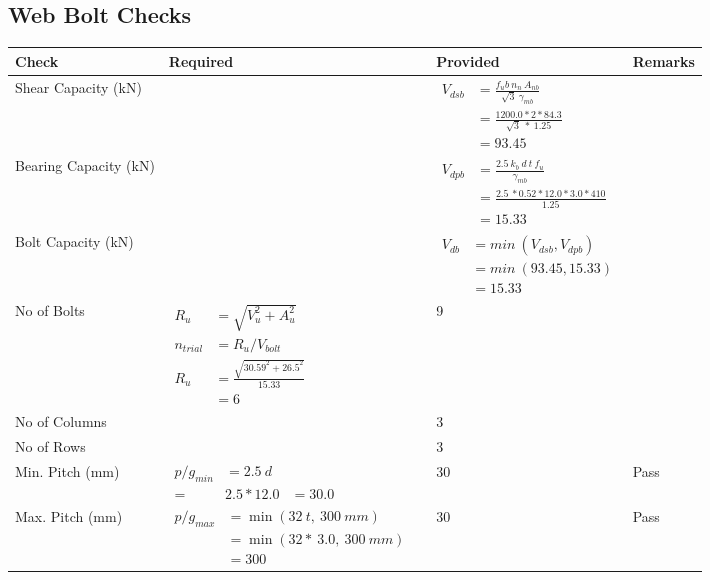 \documentclass{article}%
\begin{document}
\subsection{Web Bolt Checks}%
\label{subsec:WebBoltChecks}%
\renewcommand{\arraystretch}{1.2}%
\begin{longtable}{|p{4cm}|p{6cm}|p{5.5cm}|p{1.5cm}|}%
\hline%
\rowcolor{OsdagGreen}%
Check&Required&Provided&Remarks\\%
\hline%
\endhead%
\hline%
Shear Capacity (kN)&&$\begin{aligned}V_{dsb} &= \frac{f_ub ~n_n~ A_{nb}}{\sqrt{3} ~\gamma_{mb}}\\ &= \frac{1200.0*2*84.3}{\sqrt{3}~*~1.25}\\ &= 93.45\end{aligned}$&\\%
\hline%
Bearing Capacity (kN)&&$\begin{aligned}V_{dpb} &= \frac{2.5~ k_b~ d~ t~ f_u}{\gamma_{mb}}\\ &= \frac{2.5~*0.52*12.0*3.0*410}{1.25}\\ &=15.33\end{aligned}$&\\%
\hline%
Bolt Capacity (kN)&&$\begin{aligned}V_{db} &= min~ (V_{dsb}, V_{dpb})\\ &= min~ (93.45,15.33)\\ &=15.33\end{aligned}$&\\%
\hline%
No of Bolts&$\begin{aligned}R_{u} &= \sqrt{V_u^2+A_u^2}\\ n_{trial} &= R_u/ V_{bolt}\\ R_{u} &= \frac{\sqrt{30.59^2+26.5^2}}{15.33}\\ &=6\end{aligned}$&9&\\%
\hline%
No of Columns&&3&\\%
\hline%
No of Rows&&3&\\%
\hline%
Min. Pitch (mm)&$\begin{aligned}p/g_{min}&= 2.5 ~ d&\\ =&2.5*12.0&=30.0\end{aligned}$&30&Pass\\%
\hline%
Max. Pitch (mm)&$\begin{aligned}p/g_{max} &=\min(32~t,~300~mm)&\\ &=\min(32 *~3.0,~ 300 ~mm)\\&=300\end{aligned}$&30&Pass\\%

\end{longtable}
\end{document}
